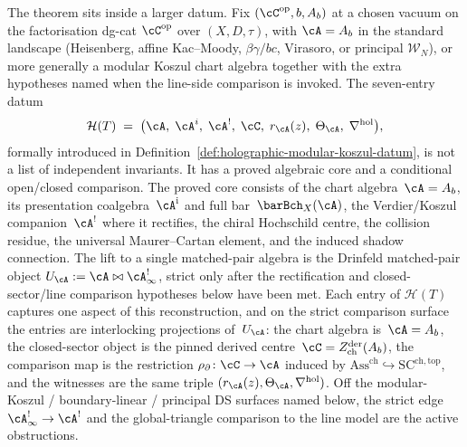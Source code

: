 The theorem sits inside a larger datum. Fix
$(\cC^{\mathrm{op}}, b, A_b)$ at a chosen vacuum on the factorisation
dg-cat $\cC^{\mathrm{op}}$ over $(X, D, \tau)$, with $\cA = A_b$ in
the standard landscape \textup{(}Heisenberg, affine
Kac--Moody, $\beta\gamma/bc$, Virasoro, or principal
$\mathcal{W}_N$\textup{)}, or more generally a modular Koszul chart
algebra together with the extra hypotheses named when the line-side
comparison is invoked. The seven-entry datum
\[
\mathcal{H}(T) \;=\;
\bigl(\cA,\;\cA^i,\;\cA^!,\;\cC,\;r_\cA(z),\;\Theta_\cA,\;\nabla^{\mathrm{hol}}\bigr),
\]
formally introduced in
Definition~\ref{def:holographic-modular-koszul-datum}, is not a
list of independent invariants. It has a proved algebraic core
and a conditional open/closed comparison. The proved core consists of the
chart algebra~$\cA = A_b$, its presentation coalgebra~$\cA^{\mathrm i}$
and full bar~$\barBch_X(\cA)$, the
Verdier/Koszul companion~$\cA^!$ where it rectifies, the chiral
Hochschild centre, the collision residue, the universal
Maurer--Cartan element, and the induced shadow connection.
The lift to a single matched-pair algebra is the Drinfeld
matched-pair object
$U_\cA := \cA \bowtie \cA^{!}_\infty$, strict only after the
rectification and closed-sector/line comparison hypotheses below have been
met. Each entry of $\mathcal{H}(T)$ captures one aspect of this
reconstruction, and on the strict comparison surface the entries
are interlocking projections of~$U_\cA$:
the chart algebra is~$\cA = A_b$, the closed-sector object is the
pinned derived centre~$\cC = Z^{\mathrm{der}}_{\mathrm{ch}}(A_b)$,
the comparison map is the restriction
$\rho_{\partial}\colon \cC\to\cA$ induced by
$\mathrm{Ass}^{\mathrm{ch}}\hookrightarrow\mathrm{SC}^{\mathrm{ch,top}}$,
and the witnesses are the same triple
$(r_\cA(z),\Theta_\cA,\nabla^{\mathrm{hol}})$. Off the
modular-Koszul / boundary-linear / principal DS surfaces named below,
the strict edge $\cA^{!}_\infty\to\cA^!$ and the global-triangle
comparison to the line model are the active obstructions.
